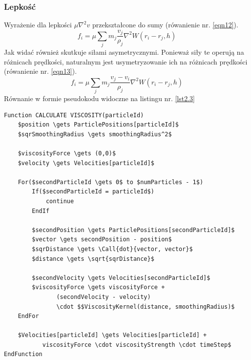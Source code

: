 \documentclass{article}
\begin{document}
\subsubsection{Lepkość}
Wyrażenie dla lepkości $\mu \nabla^2v$ przekształcone do sumy (rówanienie nr. \ref{eqn12}).\newline
\begin{equation}\label{eqn12}
f_i = \mu\sum_j m_j \frac{v_j}{\rho_j}\nabla^2W(r_i-r_j,h)
\end{equation}
Jak widać również skutkuje siłami asymetrycznymi. Ponieważ siły te operują na różnicach prędkości, naturalnym jest usymetryzowanie ich na różnicach prędkości (rówanienie nr. \ref{eqn13}).\newline
\begin{equation}\label{eqn13}
f_i = \mu\sum_j m_j \frac{v_j-v_i}{\rho_j}\nabla^2W(r_i-r_j,h)
\end{equation}
\noindent
Równanie w formie pseudokodu widoczne na listingu nr. \ref{lst2.3}\newline
\begin{lstlisting}[language=Pseudocode,mathescape=true,caption=Obliczenia lepkości,label={lst2.3}]
Function CALCULATE VISCOSITY(particleId)
    $position \gets ParticlePositions[particleId]$
    $sqrSmoothingRadius \gets smoothingRadius^2$

    $viscosityForce \gets (0,0)$
    $velocity \gets Velocities[particleId]$

    For($secondParticleId \gets 0$ to $numParticles - 1$)
        If($secondParticleId = particleId$)
            continue
        EndIf

        $secondPosition \gets ParticlePositions[secondParticleId]$
        $vector \gets secondPosition - position$
        $sqrDistance \gets \Call{dot}{vector, vector}$
        $distance \gets \sqrt{sqrDistance}$

        $secondVelocity \gets Velocities[secondParticleId]$
        $viscosityForce \gets viscosityForce +
               (secondVelocity - velocity)
               \cdot $$ViscosityKernel(distance, smoothingRadius)$
    EndFor

    $Velocities[particleId] \gets Velocities[particleId] +
           viscosityForce \cdot viscosityStrength \cdot timeStep$
EndFunction
\end{lstlisting}
\end{document}
